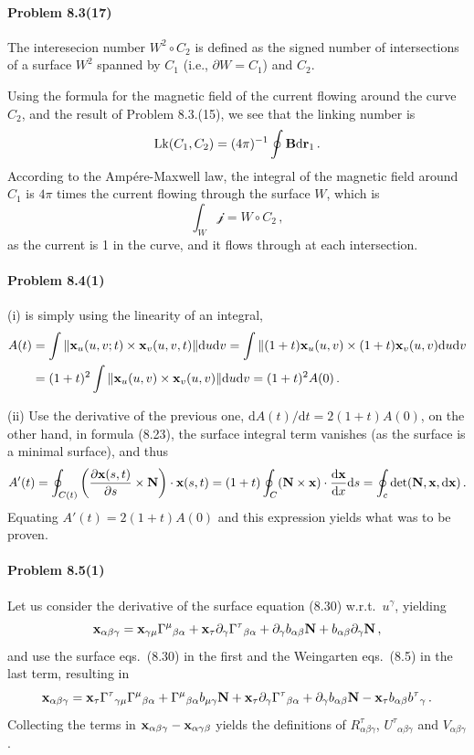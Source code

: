 \documentclass[a4paper,12pt]{article}
\def\d{\mathrm{d}}
\newcommand{\problem}[1]{\paragraph{Problem #1}}
\begin{document}
\problem{8.3(17)} The interesecion number $W^2\circ C_2$ is defined as the signed number of intersections of a surface $W^2$ spanned by $C_1$ (i.e., $\partial W=C_1$) and $C_2$.

Using the formula for the magnetic field of the current flowing around the curve $C_2$, and the result of Problem 8.3.(15), we see that the linking number is
\[
 \mathop{\rm Lk}(C_1, C_2) = (4\pi)^{-1}\oint {\bf B} \d {\bf r}_1\,.
\]
According to the Ampére-Maxwell law, the integral of the magnetic field around $C_1$ is $4\pi$ times the current flowing through the surface $W$, which is
\[
 \int_W \mathcal{j} = W\circ C_2\,,
\]
as the current is 1 in the curve, and it flows through at each intersection.


\problem{8.4(1)} (i) is simply using the linearity of an integral,
\[\begin{aligned}
 A(t) &= \int \| {\bf x}_u (u, v; t) \times {\bf x}_v(u, v, t) \| \d u \d v = \int \|(1+t) {\bf x}_u(u, v) \times (1+t) {\bf x}_v(u, v)\d u \d v\\
 &= (1+t)^2\int \|{\bf x}_u(u, v) \times {\bf x}_v(u, v)\|\d u \d v = (1+t)^2 A(0)\,.
\end{aligned}\]

(ii) Use the derivative of the previous one,
$\d A(t) / \d t = 2 (1+t) A(0)$, on the other hand, in formula (8.23), the surface integral term vanishes (as the surface is a minimal surface), and thus
\[
 A'(t) = \oint_{C(t)} \left(\frac{\partial {\bf x}(s, t)}{\partial s} \times {\bf N} \right)\cdot {\bf x}(s, t) = (1+t) \oint_C ({\bf N }\times {\bf x})\cdot \frac{\d {\bf x}}{\d x}\d s = \oint_c \det ({\bf N}, {\bf x}, \d {\bf x})\,.
\]
Equating $A'(t)=2(1+t)A(0)$ and this expression yields what was to be proven.


\problem{8.5(1)} Let us consider the derivative of the surface equation (8.30) w.r.t.\ $u^\gamma$, yielding
\[
 {\bf x}_{\alpha\beta\gamma} = {\bf x}_{\gamma\mu}\Gamma^\mu{}_{\beta\alpha} + {\bf x}_\tau \partial_\gamma\Gamma^\tau{}_{\beta\alpha}+\partial_\gamma b_{\alpha\beta}{\bf N}+b_{\alpha\beta}\partial_\gamma {\bf N}\,,
\]
and use the surface eqs.\ (8.30) in the first and the Weingarten eqs.\ (8.5) in the last term, resulting in
\[
 {\bf x}_{\alpha\beta\gamma} = {\bf x}_{\tau}\Gamma^\tau{}_{\gamma\mu}\Gamma^\mu{}_{\beta\alpha} + \Gamma^\mu{}_{\beta\alpha}b_{\mu\gamma}{\bf N} + {\bf x}_\tau \partial_\gamma\Gamma^\tau{}_{\beta\alpha}+\partial_\gamma b_{\alpha\beta}{\bf N}-{\bf x}_\tau b_{\alpha\beta}b^\tau{}_\gamma\,.
\]
Collecting the terms in ${\bf x}_{\alpha\beta\gamma}-{\bf x}_{\alpha\gamma\beta}$ yields the definitions of $R^\tau_{\alpha\beta\gamma}$, $U^\tau{}_{\alpha\beta\gamma}$ and $V_{\alpha\beta\gamma}$.
\end{document}
